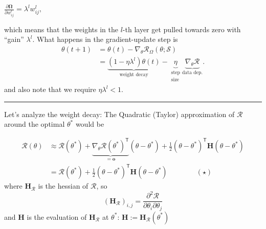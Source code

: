 \documentclass[a2paper,4pt]{extarticle}
\newcommand{\cR}{\mathcal{R}}
\newcommand{\cS}{\mathcal{S}}
\newcommand*{\T}{\mathsf{T}}
\newcommand{\mat}[1]{\mathbf{#1}}
\renewcommand{\vec}[1]{\mathbf{#1}}
\newcommand{\vo}{\vec{o}}
\newcommand{\MH}{\mat{H}}
\newcommand{\MOmega}{\mat{\Omega}}
\newcommand{\sep}{\vspace{0pt}\noindent\hrule\vspace{0pt}}
\newcommand{\sep}{\vspace{5pt}\noindent\hrule\vspace{5pt}}
\begin{document}
\begin{landscape}
\begin{multicols*}{7}
$
\frac{\partial \MOmega}{\partial w_{ij}^l}
=
\lambda^lw_{ij}^l,
$

which means that the weights in the $l$-th layer get pulled towards zero with
``gain'' $\lambda^l$. What happens in the gradient-update step is
\begin{align*}
\theta(t+1)
&=\theta(t)-\nabla_{\theta}\cR_{\Omega}(\theta;\cS)
\\
&=
\underbrace{(1-\eta\lambda^l)\theta(t)}_{\text{weight decay}}
-\underbrace{\eta}_{\substack{\text{step}\\\text{size}}}
\underbrace{\nabla_\theta\cR}_{\text{data dep.}}.
\end{align*}
and also note that we require $\eta\lambda^l<1$.

\sep

Let's analyze the weight decay: The Quadratic (Taylor) approximation of $\cR$
around the optimal $\theta^*$ would be

\begin{align*}
\cR(\theta)
&\approx
\cR(\theta^*)
+
\underbrace{\nabla_{\theta}\cR(\theta^*)^\T}_{=\vo}(\theta-\theta^*)
+
\frac{1}{2}(\theta-\theta^*)^\T\MH(\theta-\theta^*)
\\
&=\cR(\theta^*)
+
\frac{1}{2}(\theta-\theta^*)^\T\MH(\theta-\theta^*)
\qquad\qquad(\star)
\end{align*}
where $\MH_{\cR}$ is the hessian of $\cR$, so
\[
(\MH_{\cR})_{i,j}
=
\frac{\partial^2 \cR}{\partial \theta_i \partial \theta_j}
\]
and $\MH$ is the evaluation of $\MH_{\cR}$ at $\theta^*$:
$
\MH := \MH_{\cR}(\theta^*)
$


\end{multicols*}
\end{landscape}
\end{document}
